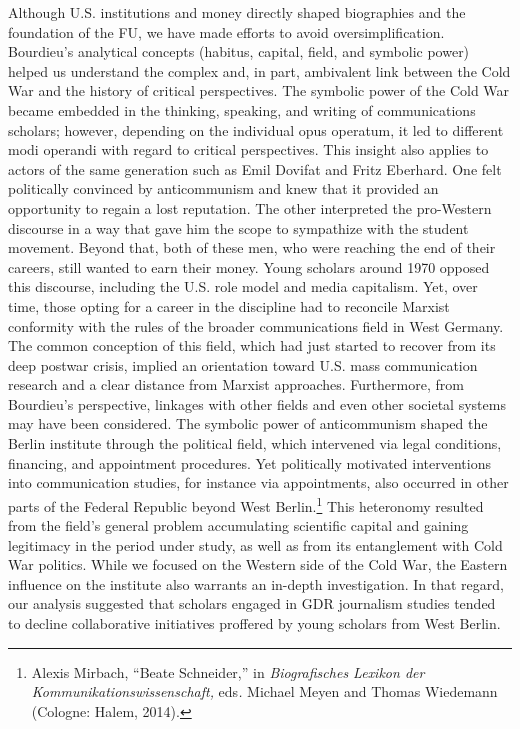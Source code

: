 \documentclass{tufte-handout}
\begin{document}
Although U.S. institutions and money directly shaped biographies and the
foundation of the FU, we have made efforts to avoid oversimplification.
Bourdieu's analytical concepts (habitus, capital, field, and symbolic
power) helped us understand the complex and, in part, ambivalent link
between the Cold War and the history of critical perspectives. The
symbolic power of the Cold War became embedded in the thinking,
speaking, and writing of communications scholars; however, depending on
the individual opus operatum, it led to different modi operandi with
regard to critical perspectives. This insight also applies to actors of
the same generation such as Emil Dovifat and Fritz Eberhard. One felt
politically convinced by anticommunism and knew that it provided an
opportunity to regain a lost reputation. The other interpreted the
pro-Western discourse in a way that gave him the scope to sympathize
with the student movement. Beyond that, both of these men, who were
reaching the end of their careers, still wanted to earn their money.
Young scholars around 1970 opposed this discourse, including the U.S.
role model and media capitalism. Yet, over time, those opting for a
career in the discipline had to reconcile Marxist conformity with the
rules of the broader communications field in West Germany. The common
conception of this field, which had just started to recover from its
deep postwar crisis, implied an orientation toward U.S. mass
communication research and a clear distance from Marxist approaches.
Furthermore, from Bourdieu's perspective, linkages with other fields and
even other societal systems may have been considered. The symbolic power
of anticommunism shaped the Berlin institute through the political
field, which intervened via legal conditions, financing, and appointment
procedures. Yet politically motivated interventions into communication
studies, for instance via appointments, also occurred in other parts of
the Federal Republic beyond West Berlin.\footnote{Alexis Mirbach,
  ``Beate Schneider,'' in \emph{Biografisches Lexikon der
  Kommunikationswissenschaft,} eds\emph{.} Michael Meyen and Thomas
  Wiedemann (Cologne: Halem, 2014).} This heteronomy resulted from the
field's general problem accumulating scientific capital and gaining
legitimacy in the period under study, as well as from its entanglement
with Cold War politics. While we focused on the Western side of the Cold
War, the Eastern influence on the institute also warrants an in-depth
investigation. In that regard, our analysis suggested that scholars
engaged in GDR journalism studies tended to decline collaborative
initiatives proffered by young scholars from West Berlin.
\end{document}
